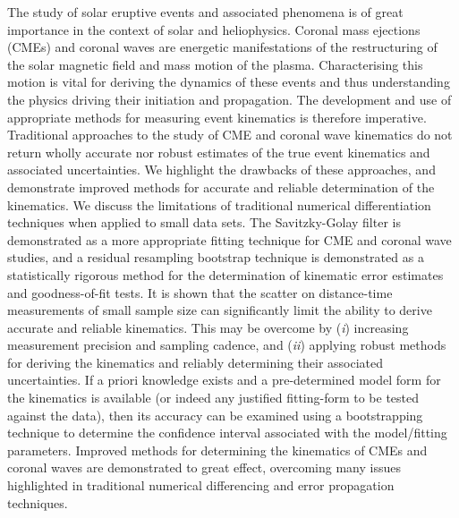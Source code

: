 \documentclass[referee]{aa}
\begin{document}
\date{Received ?; accepted ?}
\abstract
{The study of solar eruptive events and associated phenomena is of great importance in the context of solar and heliophysics. Coronal mass ejections (CMEs) and coronal waves are energetic manifestations of the restructuring of the solar magnetic field and mass motion of the plasma. Characterising this motion is vital for deriving the dynamics of these events and thus understanding the physics driving their initiation and propagation. The development and use of appropriate methods for measuring event kinematics is therefore imperative.} 
{Traditional approaches to the study of CME and coronal wave kinematics do not return wholly accurate nor robust estimates of the true event kinematics and associated uncertainties. We highlight the drawbacks of these approaches, and demonstrate improved methods for accurate and reliable determination of the kinematics.}
{We discuss the limitations of traditional numerical differentiation techniques when applied to small data sets. The Savitzky-Golay filter is demonstrated as a more appropriate fitting technique for CME and coronal wave studies, and a residual resampling bootstrap technique is demonstrated as a statistically rigorous method for the determination of kinematic error estimates and goodness-of-fit tests.}
{It is shown that the scatter on distance-time measurements of small sample size can significantly limit the ability to derive accurate and reliable kinematics. This may be overcome by (\emph{i}) increasing measurement precision and sampling cadence, and (\emph{ii}) applying robust methods for deriving the kinematics and reliably determining their associated uncertainties. If a priori knowledge exists and a pre-determined model form for the kinematics is available (or indeed any justified fitting-form to be tested against the data), then its accuracy can be examined using a bootstrapping technique to determine the confidence interval associated with the model/fitting parameters.}
{Improved methods for determining the kinematics of CMEs and coronal waves are demonstrated to great effect, overcoming many issues highlighted in traditional numerical differencing and error propagation techniques.}


\end{document}

